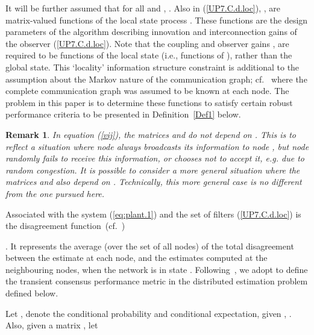 \documentclass[a4paper,twocolumn]{autart}
\newtheorem{remark}{Remark}
\begin{document}
It will be further assumed that
 for all  and ,
. Also in (\ref{UP7.C.d.loc}), ,  are
matrix-valued functions of the local state process . These
functions are the design parameters of the algorithm describing innovation
and interconnection gains of the observer (\ref{UP7.C.d.loc}). Note that 
the coupling and
observer gains ,   are required to be
functions of the local state (i.e., functions of ), rather than the
global state. This `locality' information structure 
constraint is additional to the assumption about the Markov nature of the communication
graph; cf.~\cite{SS-2009} where the complete communication
graph was assumed to be known at each node. The problem in this paper is to determine these functions to
satisfy certain robust performance criteria to be presented in
Definition~\ref{Def1} below. 


\begin{remark}\label{rem2}
In equation (\ref{vij}), the matrices 
and  do not depend on
  . This is
to reflect a situation where  
node  \emph{always} broadcasts its information to node , but node 
randomly fails to receive this information, or chooses not to accept it,
e.g. due to random congestion. 
It is possible to consider a
more general situation where the matrices  and  also depend on
. Technically, this more general case is no different from the one
pursued here.
\end{remark}

Associated with the system (\ref{eq:plant.1}) and the set of filters
(\ref{UP7.C.d.loc}) is
the disagreement function~(cf.~\cite{OM-2004})  

. 
It represents the average (over the set of all
nodes) of the total disagreement between the estimate at each node, and the
estimates computed at the neighbouring nodes, when the network is in state . 
Following~\cite{U6}, we adopt  to define
the transient consensus performance metric in the distributed estimation problem
defined below.   

Let ,  denote
the conditional probability and conditional expectation, given  , .  Also, given a matrix , let
\end{document}
